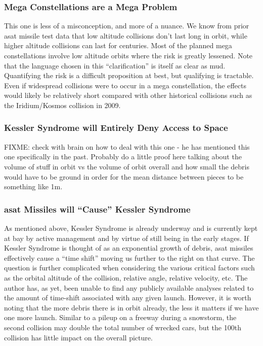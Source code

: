 \subsubsection{Mega Constellations are a Mega Problem}
This one is less of a misconception, and more of a nuance.  We know
from prior \ac{asat} missile test data that low altitude collisions
don't last long in orbit, while higher altitude collisions can last
for centuries.\cite{xxx} Most of the planned mega constellations
involve low altitude orbits where the risk is greatly
lessened.\cite[cite my own work maybe?]{xxx} Note that the language
chosen in this ``clarification'' is itself as clear as mud.
Quantifying the risk is a difficult proposition at best, but
qualifying is tractable.  Even if widespread collisions were to occur
in a mega constellation, the effects would likely be relatively short
compared with other historical collisions such as the Iridium/Kosmos
collision in 2009.\cite[my own youtube video maybe?]{xxx}

\subsubsection{Kessler Syndrome will Entirely Deny Access to Space}
FIXME: check with brain on how to deal with this one - he has
mentioned this one specifically in the past.  Probably do a little
proof here talking about the volume of stuff in orbit vs the volume of
orbit overall and how small the debris would have to be ground in
order for the mean distance between pieces to be something like 1m.

\subsubsection{\ac{asat} Missiles will ``Cause'' Kessler Syndrome}
As mentioned above, Kessler Syndrome is already underway and is
currently kept at bay by active management and by virtue of still
being in the early stages.  If Kessler Syndrome is thought of as an
exponential growth of debris, \ac{asat} missiles effectively cause a
``time shift'' moving us further to the right on that curve.  The
question is further complicated when considering the various critical
factors such as the orbital altitude of the collision, relative angle,
relative velocity, etc.  The author has, as yet, been unable to find
any publicly available analyses related to the amount of time-shift
associated with any given launch.  However, it is worth noting that
the more debris there is in orbit already, the less it matters if we
have one more launch.  Similar to a pileup on a freeway during a
snowstorm, the second collision may double the total number of wrecked
cars, but the 100th collision has little impact on the overall
picture.

